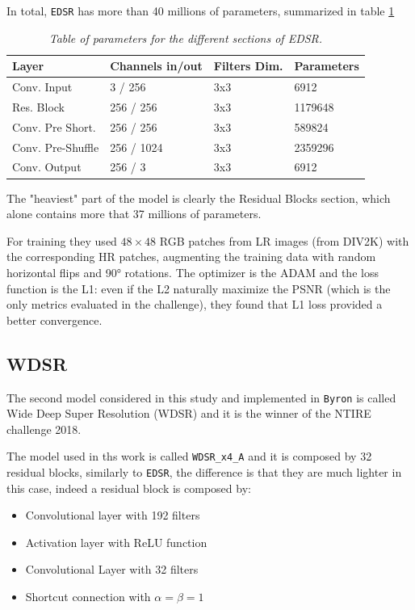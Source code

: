 \documentclass[12pt,a4paper]{report}
\begin{document}
In total, {\tt EDSR} has more than 40 millions of parameters, summarized in table \ref{tab:edsr-weights}

\begin{table}[H]
\begin{center}
\setlength{\tabcolsep}{14pt}
\begin{tabular}{|l l l l|}
 \hline
 Layer & Channels in/out & Filters Dim. & Parameters \\
 \hline
 Conv. Input       & 3 / 256     & 3x3 & 6912\\ [0.3cm]
 Res. Block        & 256 / 256   & 3x3 & 1179648\\[0.3cm]
 Conv. Pre Short.  & 256 / 256   & 3x3 & 589824\\[0.3cm]
 Conv. Pre-Shuffle & 256 / 1024  & 3x3 & 2359296 \\[0.3cm]
 Conv. Output      & 256 / 3     & 3x3 & 6912\\
 \hline
\end{tabular}
\end{center}
\label{tab:edsr-weights}
\caption{\it Table of parameters for the different sections of EDSR.}
\end{table}

The "heaviest" part of the model is clearly the Residual Blocks section, which alone contains more that 37 millions of parameters.

For training they used $48 \times 48$ RGB patches from LR images (from DIV2K) with the corresponding HR patches, augmenting the training data with random horizontal flips and 90° rotations. 
The optimizer is the ADAM \cite{adam} and the loss function is the L1: even if the L2 naturally maximize the PSNR (which is the only metrics evaluated in the challenge), they found that L1 loss provided a better convergence.

\subsection*{WDSR}

The second model considered in this study and implemented in {\tt Byron} is called Wide Deep Super Resolution (WDSR) \cite{wdsr} and it is the winner of the NTIRE challenge 2018. 

The model used in ths work is called {\tt WDSR\_x4\_A} and it is composed by 32 residual blocks, similarly to {\tt EDSR}, the difference is that they are much lighter in this case, indeed a residual block is composed by:

\begin{itemize}
 \setlength\itemsep{-0.2em}
 \item Convolutional layer with 192 filters 
 \item Activation layer with ReLU function 
 \item Convolutional Layer with 32 filters
 \item Shortcut connection with $\alpha = \beta = 1$
\end{itemize}
\end{document}
